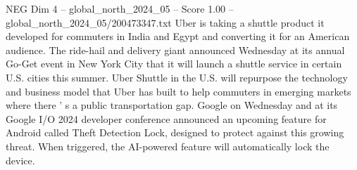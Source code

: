 \begin{textsample}{NEG Dim 4 – global\_north\_2024\_05 – Score 1.00 – global\_north\_2024\_05/200473347.txt}
Uber is taking a shuttle product it developed for commuters in India and Egypt and converting it for an American audience.
The ride-hail and delivery giant announced Wednesday at its annual Go-Get event in New York City that it will launch a shuttle service in certain U.S. cities this summer.
Uber Shuttle in the U.S. will repurpose the technology and business model that Uber has built to help commuters in emerging markets where there ' s a public transportation gap.
Google on Wednesday and at its Google I/O 2024 developer conference announced an upcoming feature for Android called Theft Detection Lock, designed to protect against this growing threat.
When triggered, the AI-powered feature will automatically lock the device.

\end{textsample}
